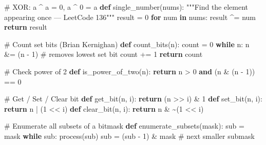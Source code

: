 \documentclass[11pt]{article}
\newenvironment{Shaded}{\begin{snugshade}}{\end{snugshade}}
\newcommand{\CommentTok}[1]{\textcolor[rgb]{0.48,0.49,0.49}{#1}}
\newcommand{\ControlFlowTok}[1]{\textcolor[rgb]{0.99,0.74,0.29}{\textbf{#1}}}
\newcommand{\DecValTok}[1]{\textcolor[rgb]{0.96,0.45,0.00}{#1}}
\newcommand{\KeywordTok}[1]{\textcolor[rgb]{0.81,0.81,0.76}{\textbf{#1}}}
\newcommand{\NormalTok}[1]{\textcolor[rgb]{0.81,0.81,0.76}{#1}}
\newcommand{\OperatorTok}[1]{\textcolor[rgb]{0.81,0.81,0.76}{#1}}
\begin{document}
\begin{Shaded}
\begin{Highlighting}[]
\CommentTok{\# XOR: a \^{} a = 0, a \^{} 0 = a}
\KeywordTok{def}\NormalTok{ single\_number(nums):}
    \CommentTok{"""Find the element appearing once — LeetCode 136"""}
\NormalTok{    result }\OperatorTok{=} \DecValTok{0}
    \ControlFlowTok{for}\NormalTok{ num }\KeywordTok{in}\NormalTok{ nums:}
\NormalTok{        result }\OperatorTok{\^{}=}\NormalTok{ num}
    \ControlFlowTok{return}\NormalTok{ result}

\CommentTok{\# Count set bits (Brian Kernighan)}
\KeywordTok{def}\NormalTok{ count\_bits(n):}
\NormalTok{    count }\OperatorTok{=} \DecValTok{0}
    \ControlFlowTok{while}\NormalTok{ n:}
\NormalTok{        n }\OperatorTok{\&=}\NormalTok{ (n }\OperatorTok{{-}} \DecValTok{1}\NormalTok{)       }\CommentTok{\# removes lowest set bit}
\NormalTok{        count }\OperatorTok{+=} \DecValTok{1}
    \ControlFlowTok{return}\NormalTok{ count}

\CommentTok{\# Check power of 2}
\KeywordTok{def}\NormalTok{ is\_power\_of\_two(n):}
    \ControlFlowTok{return}\NormalTok{ n }\OperatorTok{\textgreater{}} \DecValTok{0} \KeywordTok{and}\NormalTok{ (n }\OperatorTok{\&}\NormalTok{ (n }\OperatorTok{{-}} \DecValTok{1}\NormalTok{)) }\OperatorTok{==} \DecValTok{0}

\CommentTok{\# Get / Set / Clear bit}
\KeywordTok{def}\NormalTok{ get\_bit(n, i):   }\ControlFlowTok{return}\NormalTok{ (n }\OperatorTok{\textgreater{}\textgreater{}}\NormalTok{ i) }\OperatorTok{\&} \DecValTok{1}
\KeywordTok{def}\NormalTok{ set\_bit(n, i):   }\ControlFlowTok{return}\NormalTok{ n }\OperatorTok{|}\NormalTok{ (}\DecValTok{1} \OperatorTok{\textless{}\textless{}}\NormalTok{ i)}
\KeywordTok{def}\NormalTok{ clear\_bit(n, i): }\ControlFlowTok{return}\NormalTok{ n }\OperatorTok{\&} \OperatorTok{\textasciitilde{}}\NormalTok{(}\DecValTok{1} \OperatorTok{\textless{}\textless{}}\NormalTok{ i)}

\CommentTok{\# Enumerate all subsets of a bitmask}
\KeywordTok{def}\NormalTok{ enumerate\_subsets(mask):}
\NormalTok{    sub }\OperatorTok{=}\NormalTok{ mask}
    \ControlFlowTok{while}\NormalTok{ sub:}
\NormalTok{        process(sub)}
\NormalTok{        sub }\OperatorTok{=}\NormalTok{ (sub }\OperatorTok{{-}} \DecValTok{1}\NormalTok{) }\OperatorTok{\&}\NormalTok{ mask    }\CommentTok{\# next smaller submask}


\end{Highlighting}
\end{Shaded}
\end{document}
